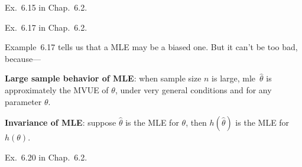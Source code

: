 \documentclass[12pt]{article}
\begin{document}
\example
Ex.~6.15 in Chap.~6.2.


\example
Ex.~6.17 in Chap.~6.2.

Example~6.17 tells us that a MLE may be a biased one.
But it can't be too bad, because---

\alert[Proposition]%
\textbf{Large sample behavior of MLE}:
when sample size $n$ is large,
mle~$\hat{\theta}$ is approximately the MVUE of $\theta$,
under very general conditions and for any parameter $\theta$.

\alert[Proposition]%
\textbf{Invariance of MLE}:
suppose $\hat{\theta}$ is the MLE for $\theta$,
then $h(\hat{\theta})$ is the MLE for $h(\theta)$.


\example
Ex.~6.20 in Chap.~6.2.
\end{document}
